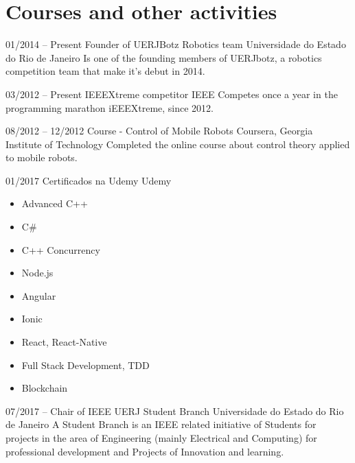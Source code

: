 \documentclass[]{friggeri-cv} %
\begin{document}


\section{Courses and other activities}

\begin{entrylist}




\entry
{01/2014 -- Present}
{\hspace{.15cm}Founder of UERJBotz Robotics team}
{Universidade do Estado do Rio de Janeiro}
{Is one of the founding members of UERJbotz, a robotics competition team that make it's debut in 2014.}

\entry
{03/2012 -- Present}
{\hspace{.15cm}IEEEXtreme competitor}
{IEEE}
{Competes once a year in the programming marathon iEEEXtreme, since 2012.}

\entry
{08/2012 -- 12/2012}
{\hspace{.15cm}Course - Control of Mobile Robots}
{Coursera, Georgia Institute of Technology}
{Completed the online course about control theory applied to mobile robots.}

\entry
{01/2017}
{\hspace{.15cm}Certificados na Udemy}
{Udemy}
{\begin{itemize}
\item Advanced C++
\item C#
\item C++ Concurrency
\item Node.js
\item Angular
\item Ionic
\item React, React-Native
\item Full Stack Development, TDD
\item Blockchain
\end{itemize}}

\entry
{07/2017 -- }
{\hspace{.15cm} Chair of  IEEE UERJ Student Branch}
{Universidade do Estado do Rio de Janeiro}
{A Student Branch is an IEEE related initiative of Students for projects in the area of ​​Engineering (mainly Electrical and Computing) for professional development and Projects of Innovation and learning.
}


\end{entrylist}
\end{document}
